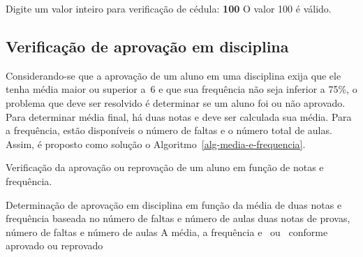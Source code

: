\documentclass[
  11pt,
  a4paper,
]{scrbook}
\newenvironment{Shaded}{\begin{snugshade}}{\end{snugshade}}
\newcommand{\KeywordTok}[1]{\textcolor[rgb]{0.13,0.29,0.53}{\textbf{#1}}}
\newcommand{\NormalTok}[1]{#1}
\begin{document}
\begin{Shaded}
\begin{Highlighting}[]
\NormalTok{Digite um valor inteiro para verificação de cédula: }\KeywordTok{ 100 }
\NormalTok{O valor 100 é válido.}
\end{Highlighting}
\end{Shaded}

\subsection{Verificação de aprovação em
disciplina}\label{verificauxe7uxe3o-de-aprovauxe7uxe3o-em-disciplina}

Considerando-se que a aprovação de um aluno em uma disciplina exija que
ele tenha média maior ou superior a~6 e que sua frequência não seja
inferior a 75\%, o problema que deve ser resolvido é determinar se um
aluno foi ou não aprovado. Para determinar média final, há duas notas e
deve ser calculada sua média. Para a frequência, estão disponíveis o
número de faltas e o número total de aulas. Assim, é proposto como
solução o Algoritmo~\ref{alg-media-e-frequencia}.

\begin{algorithm}
\caption{\label{alg-media-e-frequencia}Verificação da aprovação ou
reprovação de um aluno em função de notas e frequência.}
\begingroup%

\begin{algorithmic}
    \Description Determinação de aprovação em disciplina em função da média de duas notas e frequência baseada no número de faltas e número de aulas
    \Require duas notas de provas, número de faltas e número de aulas
    \Ensure A média, a frequência e \True\ ou \False\ conforme aprovado ou reprovado
    \Statex{}
    \Statex
    \Statex
\end{algorithmic}

\endgroup
\end{algorithm}
\end{document}
